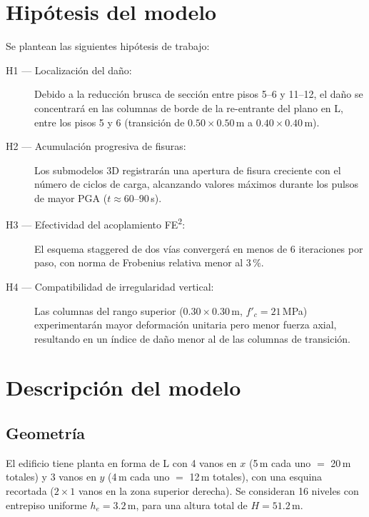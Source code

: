 \section{Hipótesis del modelo}
\label{sec:ms16-hypotheses}

Se plantean las siguientes hipótesis de trabajo:
\begin{description}
  \item[H1 --- Localización del daño:]
    Debido a la reducción brusca de sección entre pisos 5--6 y 11--12,
    el daño se concentrará en las columnas de borde de la re-entrante
    del plano en L, entre los pisos 5 y 6 (transición de $0{.}50\times
    0{.}50$\,m a $0{.}40\times 0{.}40$\,m).
  \item[H2 --- Acumulación progresiva de fisuras:]
    Los submodelos 3D registrarán una apertura de fisura creciente
    con el número de ciclos de carga, alcanzando valores máximos
    durante los pulsos de mayor PGA ($t\approx 60$--$90$\,s).
  \item[H3 --- Efectividad del acoplamiento FE\textsuperscript{2}:]
    El esquema staggered de dos vías convergerá en menos de 6
    iteraciones por paso, con norma de Frobenius relativa menor al
    3\,\%.
  \item[H4 --- Compatibilidad de irregularidad vertical:]
    Las columnas del rango superior ($0{.}30\times 0{.}30$\,m,
    $f'_c=21$\,MPa) experimentarán mayor deformación unitaria pero
    menor fuerza axial, resultando en un índice de daño menor al de
    las columnas de transición.
\end{description}

\section{Descripción del modelo}
\label{sec:ms16-model}

\subsection{Geometría}

El edificio tiene planta en forma de L con 4 vanos en $x$ (5\,m cada
uno $=$ 20\,m totales) y 3 vanos en $y$ (4\,m cada uno $=$ 12\,m
totales), con una esquina recortada ($2\times 1$ vanos en la zona
superior derecha).  Se consideran 16 niveles con entrepiso uniforme
$h_e = 3{.}2$\,m, para una altura total de $H = 51{.}2$\,m.

